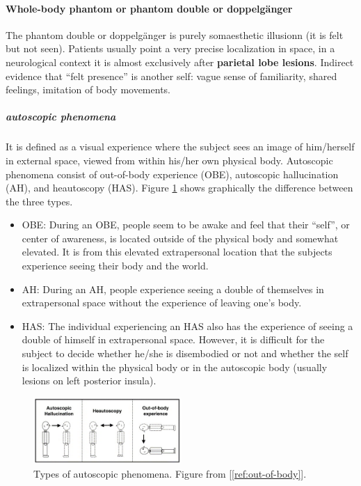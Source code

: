\documentclass[12pt,article,oneside,a4paper]{memoir}
\begin{document}
\paragraph{Whole-body phantom or phantom double or doppelg\"anger} The phantom double or doppelg\"anger is purely somaesthetic illusionn (it is felt but not seen). Patients usually point a very precise localization in space, in a neurological context it is almost exclusively after \textbf{parietal lobe lesions}. Indirect evidence that ``felt presence'' is another self: vague sense of familiarity, shared feelings, imitation of body movements.
\subparagraph{autoscopic phenomena} It is defined as a visual experience where the subject sees an image of him/herself in external space, viewed from within his/her own physical body.
Autoscopic phenomena consist of out-of-body experience (OBE), autoscopic hallucination (AH), and heautoscopy (HAS). Figure \ref{fig:autoscopic-phenomena} shows graphically the difference between the three types.
\begin{itemize}
\item OBE: During an OBE, people seem to be awake and feel that their ``self'', or center of awareness, is located outside of the physical body and somewhat elevated. It is from this elevated extrapersonal location that the subjects experience seeing their body and the world.
\item AH: During an AH, people experience seeing a double of themselves in extrapersonal space without the experience of leaving one's body.
\item HAS: The individual experiencing an HAS also has the experience of seeing a double of himself in extrapersonal space. However, it is difficult for the subject to decide whether he/she is disembodied or not and whether the self is localized within the physical body or in the autoscopic body (usually lesions on left posterior insula).
\end{itemize}

\begin{figure}[h]
  \centering
  \includegraphics[width=0.5\textwidth]{imgs/autoscopic-phenomena.png}
  \caption{Types of autoscopic phenomena. Figure from [\ref{ref:out-of-body}]. }
  \label{fig:autoscopic-phenomena}
\end{figure}
\end{document}
